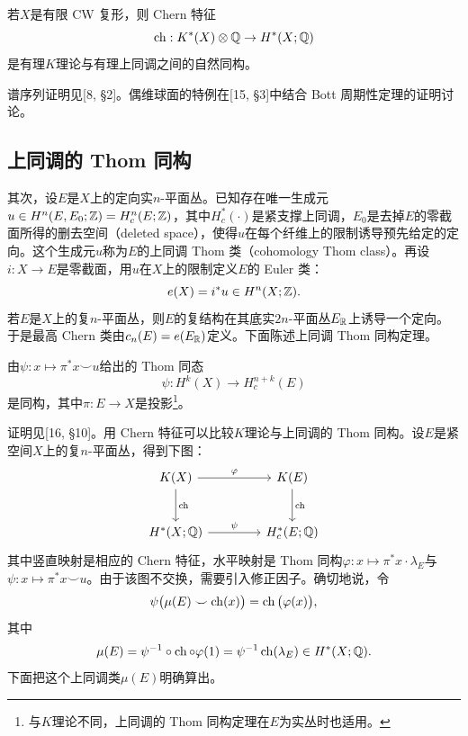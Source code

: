 \begin{theorem}
若$X$是有限 CW 复形，则 Chern 特征
\[
\operatorname{ch}:K^*(X)\otimes\mathbb{Q}\to H^*(X;\mathbb{Q})
\]
是有理$K$理论与有理上同调之间的自然同构。
\end{theorem}

谱序列证明见[8, §2]。偶维球面的特例在[15, §3]中结合 Bott 周期性定理的证明讨论。

\subsection{上同调的 Thom 同构}
其次，设$E$是$X$上的定向实$n$-平面丛。已知存在唯一生成元$u\in H^n(E,E_0;\mathbb{Z})=H^n_c(E;\mathbb{Z})$，其中$H^*_c(\cdot)$是紧支撑上同调，$E_0$是去掉$E$的零截面所得的删去空间（deleted space），使得$u$在每个纤维上的限制诱导预先给定的定向。这个生成元$u$称为$E$的上同调 Thom 类（cohomology Thom class）。再设$i:X\to E$是零截面，用$u$在$X$上的限制定义$E$的 Euler 类：
\[
e(X)=i^*u\in H^n(X;\mathbb{Z}).
\]
若$E$是$X$上的复$n$-平面丛，则$E$的复结构在其底实$2n$-平面丛$E_{\mathbb{R}}$上诱导一个定向。于是最高 Chern 类由$c_n(E)=e(E_{\mathbb{R}})$定义。下面陈述上同调 Thom 同构定理。

\begin{theorem}[Thom 同构]
由$\psi:x\mapsto\pi^*x\smile u$给出的 Thom 同态
\[
\psi:H^k(X)\to H^{n+k}_c(E)
\]
是同构，其中$\pi:E\to X$是投影\footnote{与$K$理论不同，上同调的 Thom 同构定理在$E$为实丛时也适用。}。
\end{theorem}


证明见[16, §10]。用 Chern 特征可以比较$K$理论与上同调的 Thom 同构。设$E$是紧空间$X$上的复$n$-平面丛，得到下图：
\[
\begin{tikzcd}[column sep=4.2em,row sep=2.6em]
K(X)\arrow[r,"\varphi"]\arrow[d,"\ch"] & K(E)\arrow[d,"\ch"]\\
H^*(X;\Q)\arrow[r,"\psi"] & H^*_c(E;\Q)
\end{tikzcd}
\]
其中竖直映射是相应的 Chern 特征，水平映射是 Thom 同构$\varphi:x\mapsto\pi^*x\cdot\lambda_E$与$\psi:x\mapsto\pi^*x\smile u$。由于该图不交换，需要引入修正因子。确切地说，令
\[
\psi\big(\mu(E)\smile\operatorname{ch}(x)\big)=\operatorname{ch}\big(\varphi(x)\big),
\]
其中
\[
\mu(E)=\psi^{-1}\circ\operatorname{ch}\circ\varphi(1)=\psi^{-1}\operatorname{ch}(\lambda_E)\in H^*(X;\mathbb{Q}).
\]
下面把这个上同调类$\mu(E)$明确算出。

